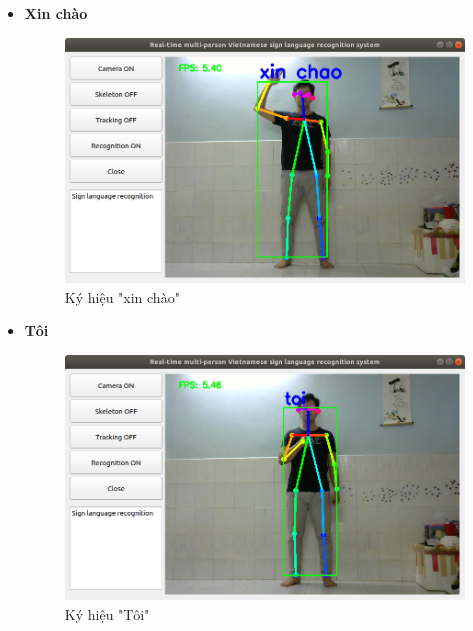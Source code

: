 \documentclass[12pt,a4paper,oneside]{book}
\numberwithin{equation}{chapter} %
\numberwithin{figure}{chapter} %
\numberwithin{table}{chapter} %
\begin{document}
\begin{itemize}

\item \textbf{Xin chào}
\FloatBarrier
\begin{figure}[htp]
\begin{center}
\includegraphics[scale=0.4]{kq/xin_chao.png}
\end{center}
\caption{Ký hiệu "xin chào"}
\end{figure}
\FloatBarrier

\item \textbf{Tôi}
\FloatBarrier
\begin{figure}[htp]
\begin{center}
\includegraphics[scale=0.4]{kq/toi.png}
\end{center}
\caption{Ký hiệu "Tôi"}
\end{figure}
\FloatBarrier

\thispagestyle{phuluc}
\pagebreak


\end{itemize}
\end{document}
